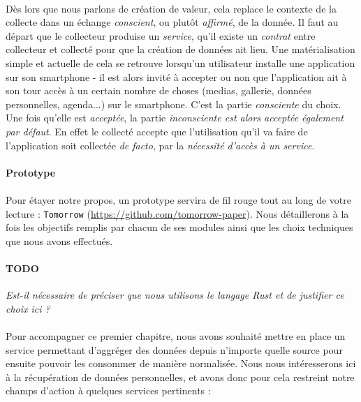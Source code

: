 \paragraph{} Dès lors que nous parlons de création de valeur, cela replace le contexte de la collecte dans un échange
\emph{conscient}, ou plutôt \emph{affirmé}, de la donnée. Il faut au départ que le collecteur produise un \emph{service},
qu'il existe un \emph{contrat} entre collecteur et collecté pour que la création de données ait lieu. Une matérialisation
simple et actuelle de cela se retrouve lorsqu'un utilisateur installe une application sur son smartphone - il est
alors invité à accepter ou non que l'application ait à son tour accès à un certain nombre de choses (medias, gallerie,
données personnelles, agenda...) sur le smartphone. C'est la partie \emph{consciente} du choix. Une fois qu'elle est
\emph{acceptée}, la partie \emph{inconsciente est alors acceptée également par défaut}. En effet le collecté accepte que
l'utilisation qu'il va faire de l'application soit collectée \emph{de facto}, par la \emph{nécessité d'accès à un service}.

\paragraph{Prototype}

\paragraph{} Pour étayer notre propos, un prototype servira de fil rouge tout au long de votre lecture : \lstinline{Tomorrow}
(\url{https://github.com/tomorrow-paper}). Nous détaillerons à la fois les objectifs remplis par chacun de ses modules
ainsi que les choix techniques que nous avons effectués.

\paragraph{TODO} \emph{Est-il nécessaire de préciser que nous utilisons le langage Rust et de justifier ce choix ici ?}

\paragraph{} Pour accompagner ce premier chapitre, nous avons souhaité mettre en place un service permettant d'aggréger
des données depuis n'importe quelle source pour ensuite pouvoir les consommer de manière normalisée.
Nous nous intéresserons ici à la récupération de données personnelles, et avons donc pour cela restreint notre champs
d'action à quelques services pertinents :

